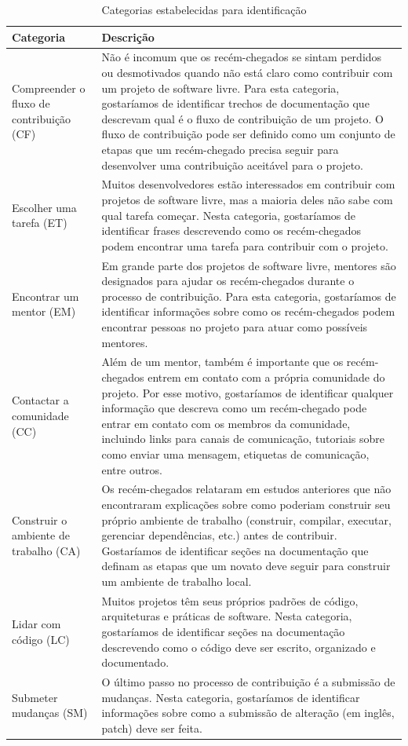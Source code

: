 \begin{table}
\caption{Categorias estabelecidas para identificação
}
\label{tab:categories}
\centering
\small
\begin{tabularx}{\textwidth}{>{\hsize=0.2\hsize}X >{\hsize=0.80\hsize}X}
\midrule
\textbf{Categoria} & \textbf{Descrição} \\
\midrule
Compreender o fluxo de contribuição (CF) & Não é incomum que os recém-chegados se sintam perdidos ou desmotivados quando não está claro como contribuir com um projeto de software livre. Para esta categoria, gostaríamos de identificar trechos de documentação que descrevam qual é o fluxo de contribuição de um projeto. O fluxo de contribuição pode ser definido como um conjunto de etapas que um recém-chegado precisa seguir para desenvolver uma contribuição aceitável para o projeto. 
\\
\rowcolor{gray} Escolher uma tarefa (ET) & Muitos desenvolvedores estão interessados em contribuir com projetos de software livre, mas a maioria deles não sabe com qual tarefa começar. Nesta categoria, gostaríamos de identificar frases descrevendo como os recém-chegados podem encontrar uma tarefa para contribuir com o projeto.
\\
Encontrar um mentor (EM) & Em grande parte dos projetos de software livre, mentores são designados para ajudar os recém-chegados durante o processo de contribuição. Para esta categoria, gostaríamos de identificar informações sobre como os recém-chegados podem encontrar pessoas no projeto para atuar como possíveis mentores.
\\
\rowcolor{gray} Contactar a comunidade (CC) & Além de um mentor, também é importante que os recém-chegados entrem em contato com a própria comunidade do projeto. Por esse motivo, gostaríamos de identificar qualquer informação que descreva como um recém-chegado pode entrar em contato com os membros da comunidade, incluindo links para canais de comunicação, tutoriais sobre como enviar uma mensagem, etiquetas de comunicação, entre outros.
\\
Construir o ambiente de trabalho (CA) & Os recém-chegados relataram em estudos anteriores que não encontraram explicações sobre como poderiam construir seu próprio ambiente de trabalho (construir, compilar, executar, gerenciar dependências, etc.) antes de contribuir. Gostaríamos de identificar seções na documentação que definam as etapas que um novato deve seguir para construir um ambiente de trabalho local.
\\
\rowcolor{gray} Lidar com código (LC) & Muitos projetos têm seus próprios padrões de código, arquiteturas e práticas de software. Nesta categoria, gostaríamos de identificar seções  na documentação descrevendo como o código deve ser escrito, organizado e documentado. \\
Submeter mudanças (SM) & O último passo no processo de contribuição é a submissão de mudanças. Nesta categoria, gostaríamos de identificar informações sobre como a submissão de alteração (em inglês, patch) deve ser feita.
\end{tabularx}
\end{table}

